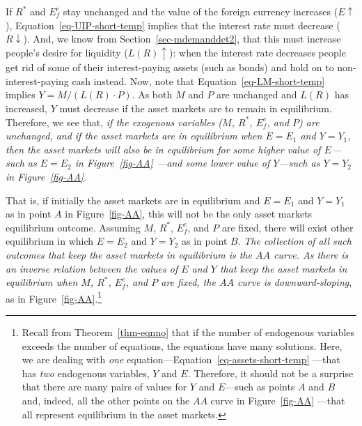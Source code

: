 \documentclass[
  letterpaper,
]{book}
\theoremstyle{plain}
\theoremstyle{remark}
\begin{document}
If \(R^*\) and \(E_f^e\) stay unchanged and the value of the foreign
currency increases (\(E\uparrow\)), Equation~\ref{eq-UIP-short-temp}
implies that the interest rate must decrease (\(R\downarrow\)). And, we
know from Section~\ref{sec-mdemanddet2}, that this must increase
people's desire for liquidity (\(L(R)\uparrow\)): when the interest rate
decreases people get rid of some of their interest-paying assets (such
as bonds) and hold on to non-interest-paying cash instead. Now, note
that Equation~\ref{eq-LM-short-temp} implies \(Y=M/(L(R)\cdot P)\). As
both \(M\) and \(P\) are unchanged and \(L(R)\) has increased, \(Y\)
must decrease if the asset markets are to remain in equilibrium.
Therefore, we see that, \emph{if the exogenous variables (\(M\),
\(R^*\), \(E_f^e\), and \(P\)) are unchanged, and if the asset markets
are in equilibrium when \(E=E_1\) and \(Y=Y_1\), then the asset markets
will also be in equilibrium for some higher value of \(E\)---such as
\(E=E_2\) in Figure~\ref{fig-AA} ---and some lower value of \(Y\)---such
as \(Y=Y_2\) in Figure~\ref{fig-AA}.}

That is, if initially the asset markets are in equilibrium and \(E=E_1\)
and \(Y=Y_1\) as in point \(A\) in Figure~\ref{fig-AA}, this will not be
the only asset markets equilibrium outcome. Assuming \(M\), \(R^*\),
\(E_f^e\), and \(P\) are fixed, there will exist other equilibrium in
which \(E=E_2\) and \(Y=Y_2\) as in point \(B\). \emph{The collection of
all such outcomes that keep the asset markets in equilibrium is the
\(AA\) curve. As there is an inverse relation between the values of
\(E\) and \(Y\) that keep the asset markets in equilibrium when \(M\),
\(R^*\), \(E_f^e\), and \(P\) are fixed, the \(AA\) curve is
downward-sloping}, as in Figure~\ref{fig-AA}.\footnote{Recall from
  Theorem~\ref{thm-eqnno} that if the number of endogenous variables
  exceeds the number of equations, the equations have many solutions.
  Here, we are dealing with \emph{one}
  equation---Equation~\ref{eq-assets-short-temp} ---that has \emph{two}
  endogenous variables, \(Y\) and \(E\). Therefore, it should not be a
  surprise that there are many pairs of values for \(Y\) and
  \(E\)---such as points \(A\) and \(B\) and, indeed, all the other
  points on the \(AA\) curve in Figure~\ref{fig-AA} ---that all
  represent equilibrium in the asset markets.}
\end{document}
